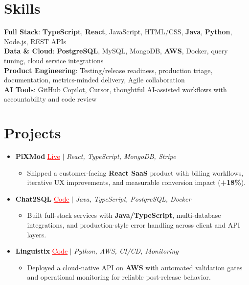 \documentclass[letterpaper,10pt]{article}
\newcommand{\resumeItem}[1]{\item\small{{#1 \vspace{-2pt}}}}
\newcommand{\resumeProjectHeading}[1]{\item \small #1 \vspace{-2pt}}
\newcommand{\resumeSubHeadingListStart}{\begin{itemize}[leftmargin=0.0in, label={}]}
\newcommand{\resumeSubHeadingListEnd}{\end{itemize}}
\newcommand{\resumeProjItemListStart}{\begin{itemize}[leftmargin=0.15in,label=\textbullet,itemsep=0pt,topsep=0pt,parsep=0pt,partopsep=0pt]}
\newcommand{\resumeProjItemListEnd}{\end{itemize}\vspace{-4pt}}
\begin{document}
\section{Skills}
\begin{itemize}[leftmargin=0.15in, label={}]
\small{\item{
\textbf{Full Stack}: \textbf{TypeScript}, \textbf{React}, JavaScript, HTML/CSS, \textbf{Java}, \textbf{Python}, Node.js, REST APIs \\
\textbf{Data \& Cloud}: \textbf{PostgreSQL}, MySQL, MongoDB, \textbf{AWS}, Docker, query tuning, cloud service integrations \\
\textbf{Product Engineering}: Testing/release readiness, production triage, documentation, metrics-minded delivery, Agile collaboration \\
\textbf{AI Tools}: GitHub Copilot, Cursor, thoughtful AI-assisted workflows with accountability and code review
}}
\end{itemize}
\vspace{-16pt}
\section{Projects}
\resumeSubHeadingListStart
\vspace{-2pt}
\resumeProjectHeading{\textbf{PiXMod} {\href{https://pixmod.vercel.app/}{\textcolor{red}{\underline{Live}}}} $|$ \emph{React, TypeScript, MongoDB, Stripe}}
\resumeProjItemListStart
\resumeItem{Shipped a customer-facing \textbf{React SaaS} product with billing workflows, iterative UX improvements, and measurable conversion impact (\textbf{+18\%}).}
\resumeProjItemListEnd
\vspace{3pt}
\resumeProjectHeading{\textbf{Chat2SQL} {\href{https://github.com/SAHAJ-BHADJA/Chat2SQL}{\textcolor{red}{\underline{Code}}}} $|$ \emph{Java, TypeScript, PostgreSQL, Docker}}
\resumeProjItemListStart
\resumeItem{Built full-stack services with \textbf{Java/TypeScript}, multi-database integrations, and production-style error handling across client and API layers.}
\resumeProjItemListEnd
\vspace{3pt}
\resumeProjectHeading{\textbf{Linguistix} {\href{https://github.com/SAHAJ-BHADJA/Linguistix}{\textcolor{red}{\underline{Code}}}} $|$ \emph{Python, AWS, CI/CD, Monitoring}}
\resumeProjItemListStart
\resumeItem{Deployed a cloud-native API on \textbf{AWS} with automated validation gates and operational monitoring for reliable post-release behavior.}
\resumeProjItemListEnd
\resumeSubHeadingListEnd
\end{document}
